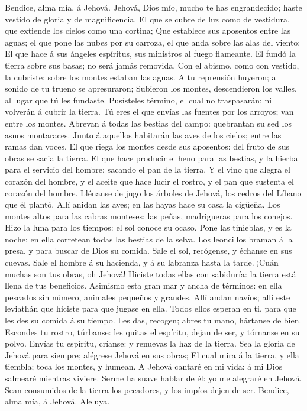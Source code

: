  Bendice, alma mía, á Jehová. Jehová, Dios mío, mucho te has
engrandecido; haste vestido de gloria y de magnificencia. 
El que se cubre de luz como de vestidura, que extiende los cielos como
una cortina;  Que establece sus aposentos entre las aguas;
el que pone las nubes por su carroza, el que anda sobre las alas del
viento;  El que hace á sus ángeles espíritus, sus ministros
al fuego flameante.  El fundó la tierra sobre sus basas; no
será jamás removida.  Con el abismo, como con vestido, la
cubriste; sobre los montes estaban las aguas.  A tu
reprensión huyeron; al sonido de tu trueno se apresuraron; 
Subieron los montes, descendieron los valles, al lugar que tú les
fundaste.  Pusísteles término, el cual no traspasarán; ni
volverán á cubrir la tierra.  Tú eres el que envías las
fuentes por los arroyos; van entre los montes.  Abrevan á
todas las bestias del campo: quebrantan su sed los asnos montaraces.
 Junto á aquellos habitarán las aves de los cielos; entre
las ramas dan voces.  El que riega los montes desde sus
aposentos: del fruto de sus obras se sacia la tierra.  El
que hace producir el heno para las bestias, y la hierba para el servicio
del hombre; sacando el pan de la tierra.  Y el vino que
alegra el corazón del hombre, y el aceite que hace lucir el rostro, y el
pan que sustenta el corazón del hombre.  Llénanse de jugo
los árboles de Jehová, los cedros del Líbano que él plantó.
 Allí anidan las aves; en las hayas hace su casa la
cigüeña.  Los montes altos para las cabras monteses; las
peñas, madrigueras para los conejos.  Hizo la luna para los
tiempos: el sol conoce su ocaso.  Pone las tinieblas, y es
la noche: en ella corretean todas las bestias de la selva. 
Los leoncillos braman á la presa, y para buscar de Dios su comida.
 Sale el sol, recógense, y échanse en sus cuevas.
 Sale el hombre á su hacienda, y á su labranza hasta la
tarde.  ¡Cuán muchas son tus obras, oh Jehová! Hiciste
todas ellas con sabiduría: la tierra está llena de tus beneficios.
 Asimismo esta gran mar y ancha de términos: en ella
pescados sin número, animales pequeños y grandes.  Allí
andan navíos; allí este leviathán que hiciste para que jugase en ella.
 Todos ellos esperan en ti, para que les des su comida á su
tiempo.  Les das, recogen; abres tu mano, hártanse de bien.
 Escondes tu rostro, túrbanse: les quitas el espíritu,
dejan de ser, y tórnanse en su polvo.  Envías tu espíritu,
críanse: y renuevas la haz de la tierra.  Sea la gloria de
Jehová para siempre; alégrese Jehová en sus obras;  El cual
mira á la tierra, y ella tiembla; toca los montes, y humean.
 A Jehová cantaré en mi vida: á mi Dios salmearé mientras
viviere.  Serme ha suave hablar de él: yo me alegraré en
Jehová.  Sean consumidos de la tierra los pecadores, y los
impíos dejen de ser. Bendice, alma mía, á Jehová. Aleluya.

